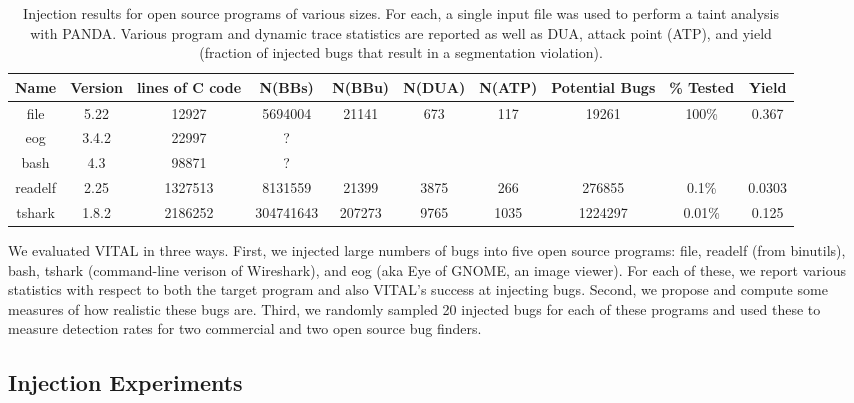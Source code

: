 
\label{section:results}

\begin{table*}[t!]
\centering
\begin{tabular}{c|c|c|c|c|c|c|c|c|c} 
Name    & Version & lines of C code & N(BBs)     & N(BBu)   &  N(DUA) & N(ATP) & Potential Bugs & \% Tested & Yield \\\hline
file    & 5.22    & 12927           & 5694004    & 21141    & 673     & 117    & 19261          & 100\%     & 0.367  \\
eog     & 3.4.2   & 22997           & ?          &          &         &        &                &           & \\
bash    & 4.3     & 98871           & ?          &          &         &        &                &           & \\
readelf & 2.25    & 1327513         & 8131559    & 21399    & 3875    & 266    & 276855         & 0.1\%     & 0.0303 \\
tshark  & 1.8.2   & 2186252         & 304741643  & 207273   & 9765    & 1035   & 1224297        & 0.01\%    & 0.125 \\
\end{tabular}
\caption{Injection results for open source programs of various sizes.
For each, a single input file was used to perform a taint analysis with PANDA.
Various program and dynamic trace statistics are reported as well as DUA, attack point (ATP), and yield (fraction of injected bugs that result in a segmentation violation).}
\end{table*}

We evaluated VITAL in three ways.
First, we injected large numbers of bugs into five open source programs: file, readelf (from binutils), bash, tshark (command-line verison of Wireshark), and eog (aka Eye of GNOME, an image viewer).
For each of these, we report various statistics with respect to both the target program and also VITAL's success at injecting bugs.
Second, we propose and compute some measures of how realistic these bugs are.
Third, we randomly sampled 20 injected bugs for each of these programs and used these to measure detection rates for two commercial and two open source bug finders.

\subsection{Injection Experiments}



